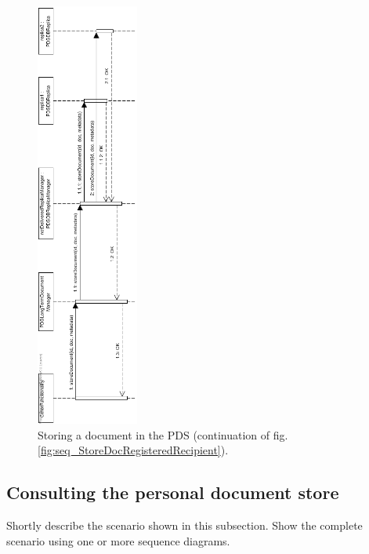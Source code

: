\documentclass[a4paper,10pt]{article}
\begin{document}
\begin{figure}[!htp]
    \centering
    \includegraphics[width=0.3\textwidth]{Seq_StoreDocPDS.png}
    \caption{Storing a document in the PDS (continuation of fig. \ref{fig:seq_StoreDocRegisteredRecipient}).
        }\label{fig:seq_StoreDocPDS}
\end{figure}

\subsection{Consulting the personal document store}
\label{scenario:ConsultPDS}
Shortly describe the scenario shown in this subsection.
Show the complete scenario using one or more sequence diagrams.
\end{document}
